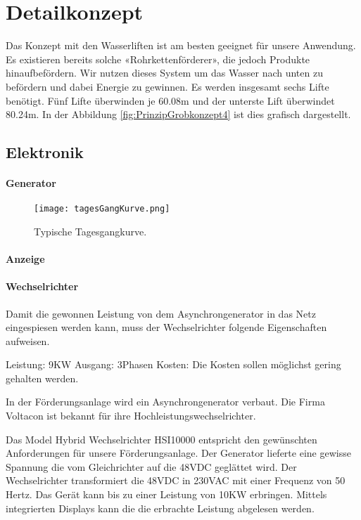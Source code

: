 \section{Detailkonzept} \label{sec:detailkonzept}

Das Konzept mit den Wasserliften ist am besten geeignet für unsere Anwendung. Es existieren bereits solche «Rohrkettenförderer», die jedoch Produkte hinaufbefördern. Wir nutzen dieses System um das Wasser nach unten zu befördern und dabei Energie zu gewinnen. Es werden insgesamt sechs Lifte benötigt. Fünf Lifte überwinden je 60.08\si{m} und der unterste Lift überwindet 80.24\si{m}. In der Abbildung \ref{fig:PrinzipGrobkonzept4}  ist dies grafisch dargestellt.

\subsection{Elektronik}

\paragraph{Generator}
\begin{figure}[H]
\centering
\texttt{[image: tagesGangKurve.png]}
\caption{Typische Tagesgangkurve. \cite{peakWaterDemand}}
\label{fig:tagesGangKurve}
\end{figure}
\paragraph{Anzeige}

\newpage
\paragraph{Wechselrichter}
Damit die gewonnen Leistung von dem Asynchrongenerator in das Netz eingespiesen werden kann, muss der Wechselrichter folgende Eigenschaften aufweisen. 

Leistung: 	9KW \newline
Ausgang:	3Phasen \newline
Kosten:		Die Kosten sollen möglichst gering gehalten werden. \newline

In der Förderungsanlage wird ein Asynchrongenerator verbaut. Die Firma Voltacon ist bekannt für ihre Hochleistungswechselrichter.

 Das Model Hybrid Wechselrichter HSI10000 entspricht den gewünschten Anforderungen für unsere Förderungsanlage. Der Generator lieferte eine gewisse Spannung die vom Gleichrichter auf die 48VDC geglättet wird. Der Wechselrichter transformiert die 48VDC in 230VAC mit einer Frequenz von 50 Hertz. Das Gerät kann bis zu einer Leistung von 10KW erbringen. Mittels integrierten Displays kann die die erbrachte Leistung abgelesen werden. 

